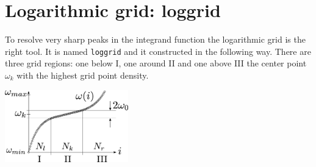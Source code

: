 \section{Logarithmic grid: loggrid}\label{sec:loggrid}
To resolve very sharp peaks in the integrand function the logarithmic grid is the right tool. It is named \texttt{loggrid} and it constructed in the following way. There are three grid regions: one below I, one around II and one above III the center point $\omega_k$ with the highest grid point density.\\

\begin{center}
	\includegraphics[width=0.4\textwidth]{pics/loggrid.eps}
\end{center}

